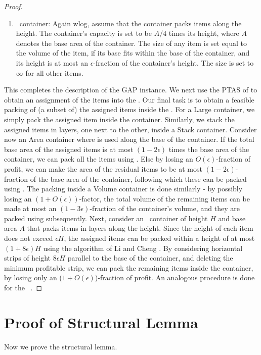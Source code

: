 \begin{proof}
\begin{enumerate}
        \item \lcb\ container: Again wlog, assume that the container packs items along the height. The container's capacity is set to be $A/4$ times its height, where $A$ denotes the base area of the container. The size of any item is set equal to the volume of the item, if its base fits within the base of the container, and its height is at most an $\epsilon$-fraction of the container's height. The size is set to $\infty$ for all other items.
    \end{enumerate}

    This completes the description of the GAP instance. We next use the PTAS of \cite{2dks-Lpacking} to obtain an assignment of the items into the \boxes. Our final task is to obtain a feasible packing of (a subset of) the assigned items inside the \boxes. For a Large container, we simply pack the assigned item inside the container. Similarly, we stack the assigned items in layers, one next to the other, inside a Stack container. Consider now an Area container where \NFDH is used along the base of the container. If the total base area of the assigned items is at most $(1-2\epsilon)$ times the base area of the container, we can pack all the items using \NFDH. Else by losing an $O(\epsilon)$-fraction of profit, we can make the area of the residual items to be at most $(1-2\epsilon)$-fraction of the base area of the container, following which these can be packed using \NFDH. The packing inside a Volume container is done similarly - by possibly losing an $(1+O(\epsilon))$-factor, the total volume of the remaining items can be made at most an $(1-3\epsilon)$-fraction of the container's volume, and they are packed using \NFDH subsequently. Next, consider an \lca\ container of height $H$ and base area $A$ that packs items in layers along the height. Since the height of each item does not exceed $\epsilon H$, the assigned items can be packed within a height of at most $(1+8\epsilon)H$ using the algorithm of Li and Cheng \cite{li1990three}. By considering horizontal strips of height $8\epsilon H$ parallel to the base of the container, and deleting the minimum profitable strip, we can pack the remaining items inside the container, by losing only an ($1+O(\epsilon)$)-fraction of profit. An analogous procedure is done for the \lcb\ \boxes.
\end{proof}
\fi

\section{Proof of Structural Lemma}
\label{sec:structurallemma}
Now we prove the structural lemma. 
